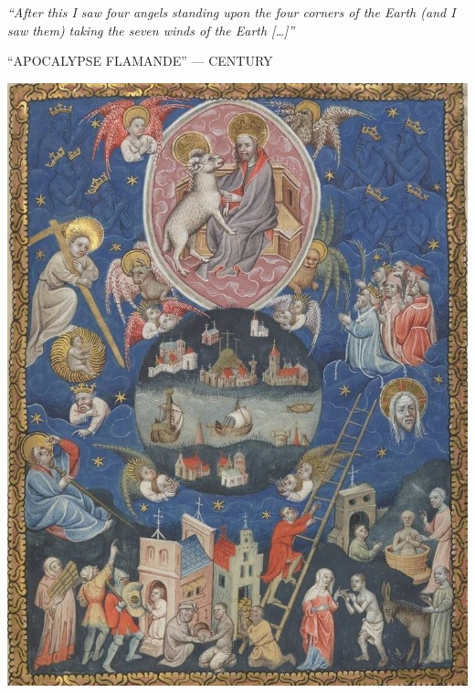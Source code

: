 \begin{pages}
\end{pages} 
\Pages

\clearpage
\thispagestyle{empty}
\null\vfill
\settowidth{}
\begin{center}
\parbox{\longest}{%
  \raggedright{\huge\itshape%
    ``After this I saw four angels standing upon the four corners of the Earth (and I saw them) taking the seven winds of the Earth […]'' \par\bigskip
  }
  \raggedleft\Large\MakeUppercase{``Apocalypse flamande'' —  century}\par%
}
\vfill\vfill
\clearpage\newpage
\end{center}
\newpage
\thispagestyle{empty}
\begin{center}
	\includegraphics[width=1\textwidth]{images/illustrations/angelsholdingwinds.jpg}
\end{center}